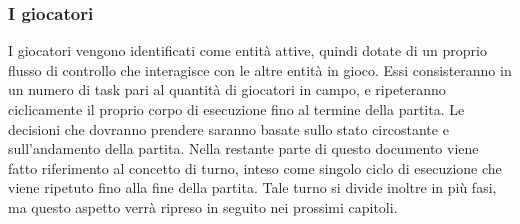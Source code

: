 \subsubsection{I giocatori}
\label{sec:entita_coinvolte_giocatori}

I giocatori vengono identificati come entità attive, quindi dotate di un proprio flusso di controllo che interagisce con le altre entità in gioco. Essi consisteranno in un numero di task pari al quantità di giocatori in campo, e ripeteranno ciclicamente il proprio corpo di esecuzione fino al termine della partita. Le decisioni che dovranno prendere saranno basate sullo stato circostante e sull'andamento della partita. Nella restante parte di questo documento viene fatto riferimento al concetto di turno, inteso come singolo ciclo di esecuzione che viene ripetuto fino alla fine della partita. Tale turno si divide inoltre in più fasi, ma questo aspetto verrà ripreso in seguito nei prossimi capitoli.

%

%

